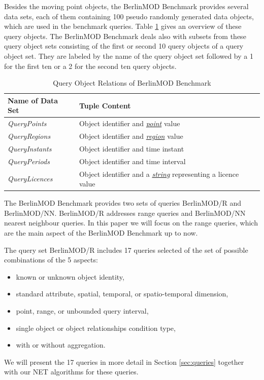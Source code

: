 \documentclass[a4paper]{article}
\newcommand{\bmodb} {BerlinMOD Benchmark}
\newcommand{\dt}[1]{\textsl{\underline{#1}}}
\begin{document}
Besides the moving point objects, the \bmodb{} provides several data sets, each
of them containing 100 pseudo randomly generated data objects, which are used in
the benchmark queries. Table \ref{tab:queryobjects} gives an overview of these
query objects. The \bmodb{} deals also with subsets from these query object
sets consisting of the first or second 10 query objects of a query object set.
They are labeled by the name of the query object set followed by a 1 for the
first ten or a 2 for the second ten query objects.

\begin{table}[htbp]
  \begin{tabularx}{1.0\textwidth}{|l|X|}
    \hline
    \textbf{Name of Data Set}&\textbf{Tuple Content}\\
    \hline
    \textit{QueryPoints}   & Object identifier and \dt{point} value\\
    \hline
    \textit{QueryRegions}  & Object identifier and \dt{region} value\\
    \hline
    \textit{QueryInstants} & Object identifier and time instant\\
    \hline
    \textit{QueryPeriods}  & Object identifier and time interval\\
    \hline
    \textit{QueryLicences} & Object identifier and a \dt{string} representing a
licence value\\
    \hline
  \end{tabularx}
  \caption{Query Object Relations of \bmodb{}}
  \label{tab:queryobjects}
\end{table}

The \bmodb{} provides two sets of queries BerlinMOD/R and BerlinMOD/NN.
BerlinMOD/R addresses range queries and BerlinMOD/NN nearest neighbour queries.
In this paper we will focus on the range queries, which are the main aspect of
the
\bmodb{} up to now.

The query set BerlinMOD/R includes 17 queries selected of the set of possible
combinations of the 5 aspects:
\begin{itemize}
  \item known or unknown object identity,
  \item standard attribute, spatial, temporal, or spatio-temporal dimension,
  \item point, range, or unbounded query interval,
  \item single object or object relationships condition type,
  \item with or without aggregation.
\end{itemize}
We will present the 17 queries in more detail in Section
\ref{sec:queries} together with our NET algorithms for these queries.
\end{document}
